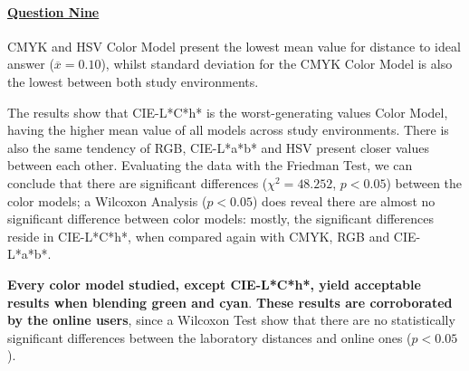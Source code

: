 \paragraph{\ul{Question Nine}}
%
CMYK and HSV Color Model present the lowest mean value for distance to ideal answer ($\overline{x} = 0.10$), whilst standard deviation for the CMYK Color Model is also the lowest between both study environments. \par
The results show that CIE-L*C*h* is the worst-generating values Color Model, having the higher mean value of all models across study environments. There is also the same tendency of RGB,
CIE-L*a*b* and HSV present closer values between each other. Evaluating the data with the Friedman Test, we can conclude that there are significant differences ($\chi^2 = 48.252$, $p < 0.05$)
between the color models; a Wilcoxon Analysis ($p < 0.05$) does reveal there are almost no significant difference between color models: mostly, the significant differences reside in CIE-L*C*h*, when
compared again with CMYK, RGB and CIE-L*a*b*. \par
%
\textbf{Every color model studied, except CIE-L*C*h*, yield acceptable results when blending green and cyan}. \textbf{These results are corroborated by the online users}, since a Wilcoxon Test show that there are no
statistically significant differences between the laboratory distances and online ones ($p < 0.05$).
%
